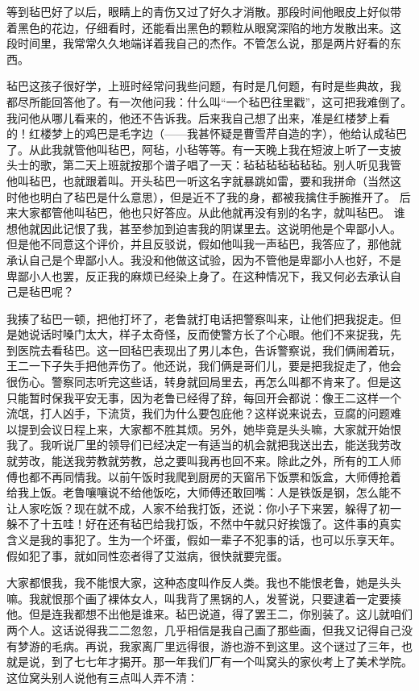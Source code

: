 等到毡巴好了以后，眼睛上的青伤又过了好久才消散。那段时间他眼皮上好似带
着黑色的花边，仔细看时，还能看出黑色的颗粒从眼窝深陷的地方发散出来。这
段时间里，我常常久久地端详着我自己的杰作。不管怎么说，那是两片好看的东
西。

毡巴这孩子很好学，上班时经常问我些问题，有时是几何题，有时是些典故，我
都尽所能回答他了。有一次他问我：什么叫“一个毡巴往里戳”，这可把我难倒了。
我问他从哪儿看来的，他还不告诉我。后来我自己想了出来，准是红楼梦上看
的！红楼梦上的鸡巴是毛字边（——我甚怀疑是曹雪芹自造的字），他给认成毡巴
了。从此我就管他叫毡巴，阿毡，小毡等等。有一天晚上我在短波上听了一支披
头士的歌，第二天上班就按那个谱子唱了一天：毡毡毡毡毡毡毡。别人听见我管
他叫毡巴，也就跟着叫。开头毡巴一听这名字就暴跳如雷，要和我拼命（当然这
时他也明白了毡巴是什么意思），但是近不了我的身，都被我擒住手腕推开了。
后来大家都管他叫毡巴，他也只好答应。从此他就再没有别的名字，就叫毡巴。
谁想他就因此记恨了我，甚至参加到迫害我的阴谋里去。这说明他是个卑鄙小人。
但是他不同意这个评价，并且反驳说，假如他叫我一声毡巴，我答应了，那他就
承认自己是个卑鄙小人。我没和他做这试验，因为不管他是卑鄙小人也好，不是
卑鄙小人也罢，反正我的麻烦已经染上身了。在这种情况下，我又何必去承认自
己是毡巴呢？

我揍了毡巴一顿，把他打坏了，老鲁就打电话把警察叫来，让他们把我捉走。但
是她说话时嗓门太大，样子太奇怪，反而使警方长了个心眼。他们不来捉我，先
到医院去看毡巴。这一回毡巴表现出了男儿本色，告诉警察说，我们俩闹着玩，
王二一下子失手把他弄伤了。他还说，我们俩是哥们儿，要是把我捉走了，他会
很伤心。警察同志听完这些话，转身就回局里去，再怎么叫都不肯来了。但是这
只能暂时保我平安无事，因为老鲁已经得了辞，每回开会都说：像王二这样一个
流氓，打人凶手，下流货，我们为什么要包庇他？这样说来说去，豆腐的问题难
以提到会议日程上来，大家都不胜其烦。另外，她毕竟是头头嘛，大家就开始恨
我了。我听说厂里的领导们已经决定一有适当的机会就把我送出去，能送我劳改
就劳改，能送我劳教就劳教，总之要叫我再也回不来。除此之外，所有的工人师
傅也都不再同情我。以前午饭时我爬到厨房的天窗吊下饭票和饭盒，大师傅抢着
给我上饭。老鲁嚷嚷说不给他饭吃，大师傅还敢回嘴：人是铁饭是钢，怎么能不
让人家吃饭？现在就不成，人家不给我打饭，还说：你小子下来罢，躲得了初一
躲不了十五哇！好在还有毡巴给我打饭，不然中午就只好挨饿了。这件事的真实
含义是我的事犯了。生为一个坏蛋，假如一辈子不犯事的话，也可以乐享天年。
假如犯了事，就如同性恋者得了艾滋病，很快就要完蛋。

大家都恨我，我不能恨大家，这种态度叫作反人类。我也不能恨老鲁，她是头头嘛。我就恨那个画了裸体女人，叫我背了黑锅的人，发誓说，只要逮着一定要揍他。但是连我都想不出他是谁来。毡巴说道，得了罢王二，你别装了。这儿就咱们两个人。这话说得我二二忽忽，几乎相信是我自己画了那些画，但我又记得自己没有梦游的毛病。再说，我家离厂里远得很，游也游不到这里。这个谜过了三年，也就是说，到了七七年才揭开。那一年我们厂有一个叫窝头的家伙考上了美术学院。这位窝头别人说他有三点叫人弄不清： 

